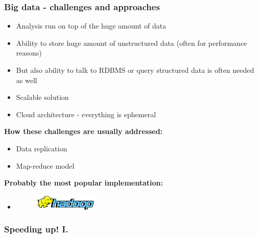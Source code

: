 \documentclass[10pt,utf8]{beamer}
\begin{document}
\begin{frame}
	\frametitle{Big data - challenges and approaches}
	\begin{itemize}
		\item Analysis run on top of the huge amount of data
		\item Ability to store huge amount of unstructured data (often for performance reasons)
		\item But also ability  to talk to RDBMS or query structured data is often needed as well
		\item Scalable solution
		\item Cloud architecture - everything is ephemeral
	\end{itemize}

	 {	
		\vspace{0.5cm}
		\textbf{How these challenges are usually addressed:}
			\begin{itemize}
			\item Data replication
			\item Map-reduce model
		\end{itemize}
	}
	
	 {
		\vspace{0.5cm}
		\textbf{Probably the most popular implementation:}
		\begin{itemize}
			\item
				\begin{figure}
					\includegraphics[width=3cm, left]{./img/hadoop-logo.eps}
				\end{figure}	
		\end{itemize}
	}

\end{frame}

\begin{frame}
	\frametitle{Speeding up! I.}
	\vspace{0.5cm}
\end{frame}
\end{document}
